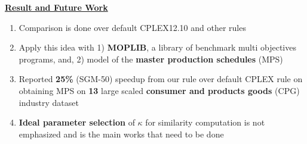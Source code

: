\documentclass{article}
\begin{document}
\begin{multicols}{3}
\begin{center}
\begin{figure}[H]
\end{figure} 
  \end{center}
\vspace{-.1cm}
\noindent
 \underline{\Large {\bf Result and Future Work}}
\begin{center}
\large
\begin{minipage}[t]{.96\linewidth}
\begin{enumerate}
\item Comparison is done over default CPLEX12.10 and other rules 
\item Apply this idea with  1) \textbf{MOPLIB}, a library of benchmark multi objectives programs, and, 2) model of the \textbf{master production schedules} (MPS)
\item Reported {\bf 25\%} (SGM-50) speedup from our rule over default CPLEX rule on obtaining MPS on {\bf 13} large scaled {\bf consumer and products goods} (CPG) industry dataset  
\item {\bf Ideal parameter selection} of $\kappa$ for similarity computation is not emphasized and is the main works that need to be done  
\end{enumerate}
\end{minipage}
\end{center}

\end{multicols}
\end{document}
